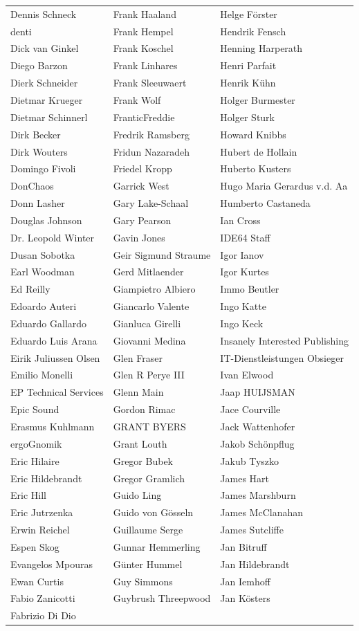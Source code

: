 \begin{small}
\begin{tabular}{p{4cm}p{4cm}p{4cm}}
Dennis Schneck & Frank Haaland & Helge Förster \\denti & Frank Hempel & Hendrik Fensch \\Dick van Ginkel & Frank Koschel & Henning Harperath \\Diego Barzon & Frank Linhares & Henri Parfait \\Dierk Schneider & Frank Sleeuwaert & Henrik Kühn \\Dietmar Krueger & Frank Wolf & Holger Burmester \\Dietmar Schinnerl & FranticFreddie & Holger Sturk \\Dirk Becker & Fredrik Ramsberg & Howard Knibbs \\Dirk Wouters & Fridun Nazaradeh & Hubert de Hollain \\Domingo Fivoli & Friedel Kropp & Huberto Kusters \\DonChaos & Garrick West & Hugo Maria Gerardus v.d. Aa \\Donn Lasher & Gary Lake-Schaal & Humberto Castaneda \\Douglas Johnson & Gary Pearson & Ian Cross \\Dr. Leopold Winter & Gavin Jones & IDE64 Staff \\Dusan Sobotka & Geir Sigmund Straume & Igor Ianov \\Earl Woodman & Gerd Mitlaender & Igor Kurtes \\Ed Reilly & Giampietro Albiero & Immo Beutler \\Edoardo Auteri & Giancarlo Valente & Ingo Katte \\Eduardo Gallardo & Gianluca Girelli & Ingo Keck \\Eduardo Luis Arana & Giovanni Medina & Insanely Interested Publishing \\Eirik Juliussen Olsen & Glen Fraser & IT-Dienstleistungen Obsieger \\Emilio Monelli & Glen R Perye III & Ivan Elwood \\EP Technical Services & Glenn Main & Jaap HUIJSMAN \\Epic Sound & Gordon Rimac & Jace Courville \\Erasmus Kuhlmann & GRANT BYERS & Jack Wattenhofer \\ergoGnomik & Grant Louth & Jakob Schönpflug \\Eric Hilaire & Gregor Bubek & Jakub Tyszko \\Eric Hildebrandt & Gregor Gramlich & James Hart \\Eric Hill & Guido Ling & James Marshburn \\Eric Jutrzenka & Guido von Gösseln & James McClanahan \\Erwin Reichel & Guillaume Serge & James Sutcliffe \\Espen Skog & Gunnar Hemmerling & Jan Bitruff \\Evangelos Mpouras & Günter Hummel & Jan Hildebrandt \\Ewan Curtis & Guy Simmons & Jan Iemhoff \\Fabio Zanicotti & Guybrush Threepwood & Jan Kösters \\Fabrizio Di Dio & 
\end{tabular}
\end{small}
